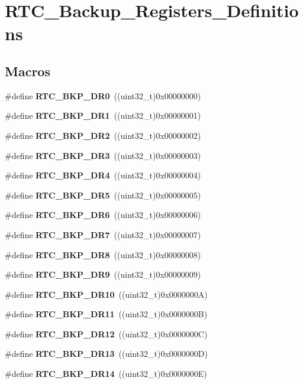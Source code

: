 \section{R\+T\+C\+\_\+\+Backup\+\_\+\+Registers\+\_\+\+Definitions}
\label{group__RTC__Backup__Registers__Definitions}
\subsection*{Macros}
\begin{DoxyCompactItemize}
\item 
\#define \textbf{ R\+T\+C\+\_\+\+B\+K\+P\+\_\+\+D\+R0}~((uint32\+\_\+t)0x00000000)
\item 
\#define \textbf{ R\+T\+C\+\_\+\+B\+K\+P\+\_\+\+D\+R1}~((uint32\+\_\+t)0x00000001)
\item 
\#define \textbf{ R\+T\+C\+\_\+\+B\+K\+P\+\_\+\+D\+R2}~((uint32\+\_\+t)0x00000002)
\item 
\#define \textbf{ R\+T\+C\+\_\+\+B\+K\+P\+\_\+\+D\+R3}~((uint32\+\_\+t)0x00000003)
\item 
\#define \textbf{ R\+T\+C\+\_\+\+B\+K\+P\+\_\+\+D\+R4}~((uint32\+\_\+t)0x00000004)
\item 
\#define \textbf{ R\+T\+C\+\_\+\+B\+K\+P\+\_\+\+D\+R5}~((uint32\+\_\+t)0x00000005)
\item 
\#define \textbf{ R\+T\+C\+\_\+\+B\+K\+P\+\_\+\+D\+R6}~((uint32\+\_\+t)0x00000006)
\item 
\#define \textbf{ R\+T\+C\+\_\+\+B\+K\+P\+\_\+\+D\+R7}~((uint32\+\_\+t)0x00000007)
\item 
\#define \textbf{ R\+T\+C\+\_\+\+B\+K\+P\+\_\+\+D\+R8}~((uint32\+\_\+t)0x00000008)
\item 
\#define \textbf{ R\+T\+C\+\_\+\+B\+K\+P\+\_\+\+D\+R9}~((uint32\+\_\+t)0x00000009)
\item 
\#define \textbf{ R\+T\+C\+\_\+\+B\+K\+P\+\_\+\+D\+R10}~((uint32\+\_\+t)0x0000000\+A)
\item 
\#define \textbf{ R\+T\+C\+\_\+\+B\+K\+P\+\_\+\+D\+R11}~((uint32\+\_\+t)0x0000000\+B)
\item 
\#define \textbf{ R\+T\+C\+\_\+\+B\+K\+P\+\_\+\+D\+R12}~((uint32\+\_\+t)0x0000000\+C)
\item 
\#define \textbf{ R\+T\+C\+\_\+\+B\+K\+P\+\_\+\+D\+R13}~((uint32\+\_\+t)0x0000000\+D)
\item 
\#define \textbf{ R\+T\+C\+\_\+\+B\+K\+P\+\_\+\+D\+R14}~((uint32\+\_\+t)0x0000000\+E)

\end{DoxyCompactItemize}
